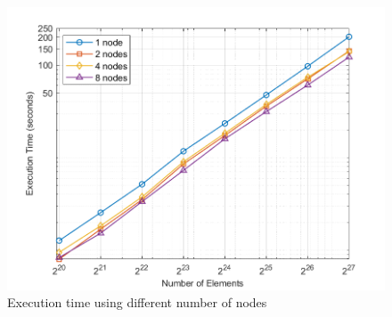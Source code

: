 \documentclass{article}
\begin{document}
\begin{figure}[h!]
    \centering
    \includegraphics[width=1\linewidth]{execution_time_vs_elements.png}
    \caption{Execution time using different number of nodes}
    \label{fig:proc vs nodes}
\end{figure}
\end{document}
